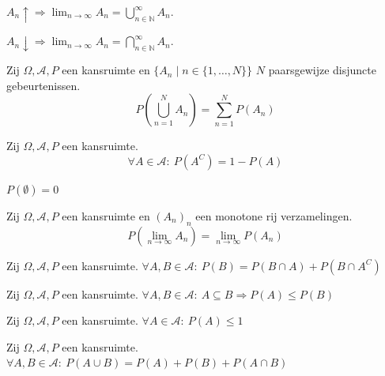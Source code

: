 \documentclass[main.tex]{subfiles}
\begin{document}
\begin{st}
  $A_{n} \uparrow \Rightarrow \lim_{n\rightarrow \infty}A_{n} = \bigcup_{n\in \mathbb{N}}^{\infty}A_{n}$.
\end{st}

\begin{st}
  $A_{n} \downarrow \Rightarrow \lim_{n\rightarrow \infty}A_{n} = \bigcap_{n\in \mathbb{N}}^{\infty}A_{n}$.
\end{st}

\begin{st}
  Zij $\Omega,\mathcal{A},P$ een kansruimte en $\{ A_{n} \mid n\in \{ 1,\dotsc,N\} \}$ $N$ paarsgewijze disjuncte gebeurtenissen.
  \[ P\left( \bigcup_{n=1}^{N}A_{n}\right) = \sum_{n=1}^{N}P(A_{n}) \]
\end{st}

\begin{st}
  Zij $\Omega,\mathcal{A},P$ een kansruimte.
  \[ \forall A \in \mathcal{A}:\ P(A^{C}) = 1 - P(A) \]
\end{st}

\begin{gev}
  $P(\emptyset) = 0$
\end{gev}

\begin{st}
  Zij $\Omega,\mathcal{A},P$ een kansruimte en $(A_{n})_{n}$ een monotone rij verzamelingen.
  \[ P\left( \lim_{n\rightarrow \infty}A_{n} \right) = \lim_{n\rightarrow \infty}P(A_{n}) \]
\end{st}

\begin{ei}
  Zij $\Omega,\mathcal{A},P$ een kansruimte.
  $\forall A,B \in \mathcal{A}:\ P(B) = P(B \cap A) + P(B \cap A^{C})$
\end{ei}

\begin{ei}
  Zij $\Omega,\mathcal{A},P$ een kansruimte.
  $\forall A,B \in \mathcal{A}:\ A \subseteq B \Rightarrow P(A) \le P(B)$
\end{ei}

\begin{ei}
  Zij $\Omega,\mathcal{A},P$ een kansruimte.
  $\forall A \in \mathcal{A}:\ P(A) \le 1$
\end{ei}

\begin{ei}
  Zij $\Omega,\mathcal{A},P$ een kansruimte.
  $\forall A,B \in \mathcal{A}:\ P(A \cup B) = P(A) + P(B) + P(A \cap B)$
\end{ei}
\end{document}
